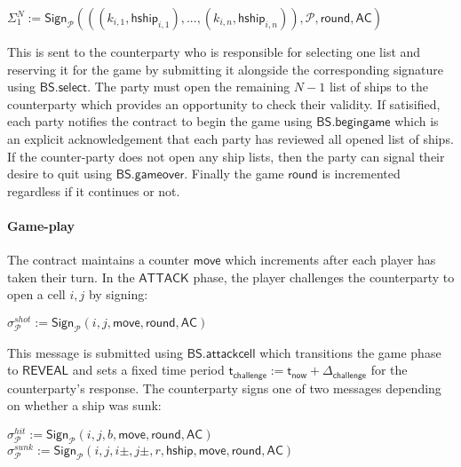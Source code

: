 \documentclass{llncs}
\newcommand{\gameattack}{\mathsf{ATTACK}}
\newcommand{\gamereveal}{\mathsf{REVEAL}}
\newcommand{\hship}{\mathsf{hship}}
\newcommand{\participant}{\mathcal{P}}
\newcommand{\sign}{\mathsf{Sign}}
\newcommand{\battleshipattackcell}{\mathsf{BS.attackcell}}
\newcommand{\battleshipbegin}{\mathsf{BS.begingame}}
\newcommand{\battleshipselectboard}{\mathsf{BS.select}}
\newcommand{\battleshipgameover}{\mathsf{BS.gameover}}
\newcommand{\appcontract}{\mathsf{AC}}
\newcommand{\timerchallenge}{\mathsf{\Delta}_{\mathsf{challenge}}}
\newcommand{\timechallenge}{\mathsf{t}_{\mathsf{challenge}}}
\newcommand{\timenow}{\mathsf{t}_{\mathsf{now}}}
\begin{document}
\begin{center}
 $\Sigma_{1}^{N} := \sign_{\participant}(((k_{i,1},\hship_{i,1}),...,(k_{i,n},\hship_{i,n})), \participant, \mathsf{round}, \appcontract)$ 
\end{center}
 
This is sent to the counterparty who is responsible for selecting one list and reserving it for the game by submitting it alongside the corresponding signature using $\battleshipselectboard$. 
The party must open the remaining $N-1$ list of ships to the counterparty which provides an opportunity to check their validity. 
If satisified, each party notifies the contract to begin the game using $\battleshipbegin$ which is an explicit acknowledgement that each party has reviewed all opened list of ships.
If the counter-party does not open any ship lists, then the party can signal their desire to quit  using $\battleshipgameover$.
Finally the game $\mathsf{round}$ is incremented regardless if it continues or not. 

\paragraph{Game-play} \label{sec:gameplayships}
The contract maintains a counter $\mathsf{move}$ which increments after each player has taken their turn. 
In the $\gameattack$ phase, the player challenges the counterparty to open a cell $i,j$ by signing: 

\begin{center}
	$\sigma^{shot}_{\participant} := \sign_{\participant}(i,j, \mathsf{move}, \mathsf{round},\appcontract)$ \\
\end{center}

This message is submitted using $\battleshipattackcell$ which transitions the game phase to $\gamereveal$ and sets a fixed time period $\timechallenge := \timenow + \timerchallenge$ for the counterparty's response. 
The counterparty signs one of two messages depending on whether a ship was sunk:

\begin{center}
	$\sigma^{hit}_{\participant} := \sign_{\participant}(i,j,b,\mathsf{move}, \mathsf{round},\appcontract)$ \\ $\sigma^{sunk}_{\participant} := \sign_{\participant}(i,j,i\pm,j\pm,r,\hship,\mathsf{move}, \mathsf{round},\appcontract)$
\end{center}
\end{document}
